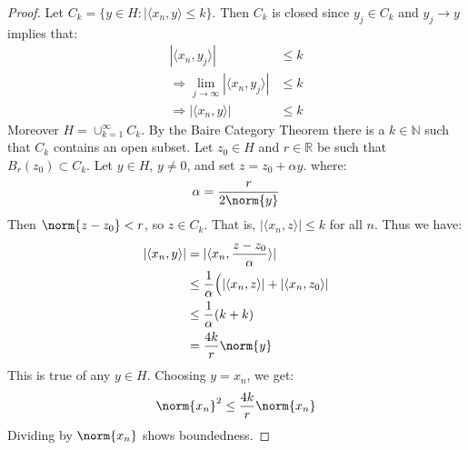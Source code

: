         \begin{proof}
            Let
            $C_{k}=\{y\in{H}:|\langle{x_{n},y}\rangle\leq{k}\}$.
            Then $C_{k}$ is closed since $y_{j}\in{C_{k}}$
            and $y_{j}\rightarrow{y}$ implies that:
            \begin{align*}
                |\langle{x_{n},y_{j}}\rangle|&\leq{k}\\
                \Rightarrow
                \underset{j\rightarrow\infty}{\lim}
                |\langle{x_{n},y_{j}}\rangle|&\leq{k}\\
                \Rightarrow
                |\langle{x_{n},y}\rangle|&\leq{k}
            \end{align*}
            Moreover $H=\cup_{k=1}^{\infty}C_{k}$. By
            the Baire Category Theorem there is a
            $k\in\mathbb{N}$ such that
            $C_{k}$ contains an open subset. Let $z_{0}\in{H}$
            and $r\in\mathbb{R}$ be such that
            $B_{r}(z_{0})\subset{C_{k}}$. Let
            $y\in{H}$, $y\ne{0}$, and set $z=z_{0}+\alpha{y}$.
            where:
            \begin{equation*}
                \alpha=\frac{r}{2\norm{y}}
            \end{equation*}
            Then $\norm{z-z_{0}}<r$, so
            $z\in{C}_{k}$. That is,
            $|\langle{x_{n},z}\rangle|\leq{k}$ for all
            $n$. Thus we have:
            \begin{align*}
                |\langle{x_{n},y}\rangle|&=
                |\langle{x_{n},\frac{z-z_{0}}{\alpha}}\rangle|\\
                &\leq
                \frac{1}{\alpha}\Big(
                |\langle{x_{n},z\rangle}|+
                |\langle{x_{n},z_{0}}\rangle|\\
                &\leq
                \frac{1}{\alpha}(k+k)\\
                &=\frac{4k}{r}\norm{y}
            \end{align*}
            This is true of any $y\in{H}$. Choosing $y=x_{n}$,
            we get:
            \begin{equation*}
                \norm{x_{n}}^{2}\leq\frac{4k}{r}\norm{x_{n}}
            \end{equation*}
            Dividing by $\norm{x_{n}}$ shows boundedness.
        \end{proof}
